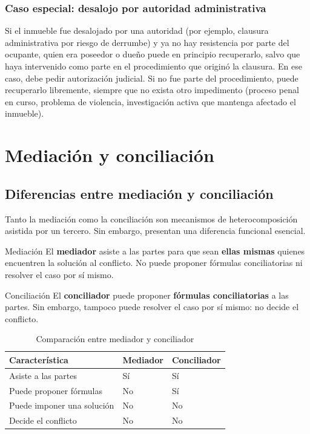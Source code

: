 \documentclass[12pt,oneside]{book}
\begin{document}
\subsection{Caso especial: desalojo por autoridad administrativa}

Si el inmueble fue desalojado por una autoridad (por ejemplo, clausura
administrativa por riesgo de derrumbe) y ya no hay resistencia por
parte del ocupante, quien era poseedor o dueño puede en principio
recuperarlo, salvo que haya intervenido como parte en el procedimiento
que originó la clausura. En ese caso, debe pedir autorización judicial.
Si no fue parte del procedimiento, puede recuperarlo libremente, siempre
que no exista otro impedimento (proceso penal en curso, problema de
violencia, investigación activa que mantenga afectado el inmueble).

\chapter{Mediaci\'on y conciliaci\'on}

\section{Diferencias entre mediaci\'on y conciliaci\'on}

Tanto la mediación como la conciliación son mecanismos de
heterocomposición asistida por un tercero. Sin embargo, presentan una
diferencia funcional esencial.

\begin{definition}{Mediaci\'on}
El \textbf{mediador} asiste a las partes para que sean \textbf{ellas
mismas} quienes encuentren la solución al conflicto. No puede proponer
fórmulas conciliatorias ni resolver el caso por sí mismo.
\end{definition}

\begin{definition}{Conciliaci\'on}
El \textbf{conciliador} puede proponer \textbf{fórmulas conciliatorias}
a las partes. Sin embargo, tampoco puede resolver el caso por sí mismo:
no decide el conflicto.
\end{definition}

\begin{table}[H]
\centering
\begin{tabularx}{\textwidth}{
    >{\raggedright\arraybackslash}X
    >{\centering\arraybackslash}p{}
    >{\centering\arraybackslash}p{}
}
\toprule
\textbf{Característica} & \textbf{Mediador} & \textbf{Conciliador} \\
\midrule
Asiste a las partes & Sí & Sí \\
Puede proponer fórmulas & No & Sí \\
Puede imponer una solución & No & No \\
Decide el conflicto & No & No \\
\bottomrule
\end{tabularx}
\caption{Comparación entre mediador y conciliador}
\end{table}
\end{document}
